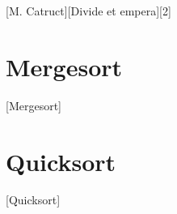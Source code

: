 \documentclass{article}
\begin{document}
	[M. Catruct][Divide et empera][2]

	\section{Mergesort}
		[Mergesort]

	\section{Quicksort}
		[Quicksort]
\end{document}
